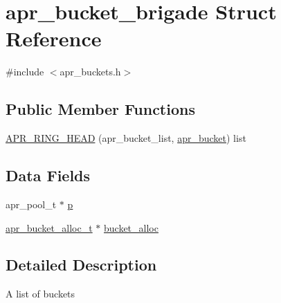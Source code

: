 \hypertarget{structapr__bucket__brigade}{\section{apr\-\_\-bucket\-\_\-brigade Struct Reference}
\label{structapr__bucket__brigade}
}


{\ttfamily \#include $<$apr\-\_\-buckets.\-h$>$}

\subsection*{Public Member Functions}
\begin{DoxyCompactItemize}
\item 
\hyperlink{structapr__bucket__brigade_a76a313afc83dd161916f3f9b83eea734}{A\-P\-R\-\_\-\-R\-I\-N\-G\-\_\-\-H\-E\-A\-D} (apr\-\_\-bucket\-\_\-list, \hyperlink{structapr__bucket}{apr\-\_\-bucket}) list
\end{DoxyCompactItemize}
\subsection*{Data Fields}
\begin{DoxyCompactItemize}
\item 
apr\-\_\-pool\-\_\-t $\ast$ \hyperlink{structapr__bucket__brigade_a8e03b4dd531903709ae3ae8ebe9e46ee}{p}
\item 
\hyperlink{group___a_p_r___util___bucket___brigades_ga9a30babfeb6e290db124d8f9b69e49e4}{apr\-\_\-bucket\-\_\-alloc\-\_\-t} $\ast$ \hyperlink{structapr__bucket__brigade_a9f58f90a088f02ebb6f935f004092aaa}{bucket\-\_\-alloc}
\end{DoxyCompactItemize}


\subsection{Detailed Description}
A list of buckets 

